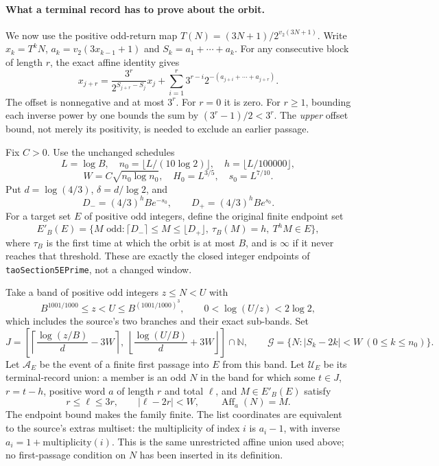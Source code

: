 \paragraph{What a terminal record has to prove about the orbit.}
We now use the positive odd-return map
$T(N)=(3N+1)/2^{v_2(3N+1)}$.
Write $x_k=T^kN$, $a_k=v_2(3x_{k-1}+1)$ and
$S_k=a_1+\cdots+a_k$. For any consecutive block of length $r$,
the exact affine identity gives
\begin{equation}
 x_{j+r}=\frac{3^r}{2^{S_{j+r}-S_j}}x_j+
 \sum_{i=1}^r3^{r-i}2^{-(a_{j+i}+\cdots+a_{j+r})}.
 \label{eq:Mazur-actual-block}
\end{equation}
The offset is nonnegative and at most $3^r$.
For $r=0$ it is zero. For $r\ge1$, bounding each inverse power
by one bounds the sum by $(3^r-1)/2<3^r$.
The \emph{upper} offset bound, not merely its positivity,
is needed to exclude an earlier passage.

Fix $C>0$. Use the unchanged schedules
\[
 L=\log B,\quad n_0=\lfloor L/(10\log2)\rfloor,\quad
 h=\lfloor L/100000\rfloor,
\]
\[
 W=C\sqrt{n_0\log n_0},\quad H_0=L^{3/5},\quad s_0=L^{7/10}.
\]
Put $d=\log(4/3)$, $\delta=d/\log2$, and
\[
 D_-=(4/3)^hB e^{-s_0},\qquad D_+=(4/3)^hB e^{s_0}.
\]
For a target set $E$ of positive odd integers, define the original
finite endpoint set
\[
 E'_B(E)=
 \{M\text{ odd}:\lceil D_-\rceil\le M\le\lfloor D_+\rfloor,\
       \tau_B(M)=h,\ T^hM\in E\},
\]
where $\tau_B$ is the first time at which the orbit is at most $B$,
and is $\infty$ if it never reaches that threshold.
These are exactly the closed integer endpoints of
\texttt{taoSection5EPrime}, not a changed window.

Take a band of positive odd integers $z\le N<U$ with
\[
 B^{1001/1000}\le z<U\le B^{(1001/1000)^3},
 \qquad 0<\log(U/z)<2\log2,
\]
which includes the source's two branches and their exact sub-bands.
Set
\[
 J=\left[\left\lceil\frac{\log(z/B)}d-3W\right\rceil,\
          \left\lfloor\frac{\log(U/B)}d+3W\right\rfloor\right]
        \cap\mathbb N,\qquad
 \mathcal G=\{N:|S_k-2k|<W\ (0\le k\le n_0)\}.
\]
Let $\mathcal A_E$ be the event of a finite first passage into $E$
from this band. Let $\mathcal U_E$ be its terminal-record union:
a member is an odd $N$ in the band for which some $t\in J$,
$r=t-h$, positive word $a$ of length $r$ and total $\ell$, and
$M\in E'_B(E)$ satisfy
\[
 r\le\ell\le3r,\qquad |\ell-2r|<W,\qquad
 \operatorname{Aff}_a(N)=M.
\]
The endpoint bound makes the family finite. The list coordinates are
equivalent to the source's extras multiset: the multiplicity of index
$i$ is $a_i-1$, with inverse $a_i=1+\text{multiplicity}(i)$.
This is the same unrestricted affine union used above;
no first-passage condition on $N$ has been inserted in its definition.

